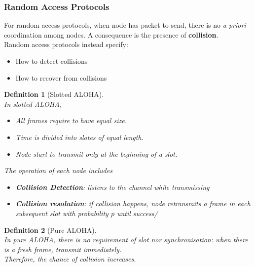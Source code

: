 \documentclass[12pt]{article}
\newtheorem{definition}{Definition}[section]
\theoremstyle{definition}
\begin{document}
\subsubsection{Random Access Protocols}
For random access protocols, when node has packet to send, there is no \textit{a priori} coordination among nodes. A consequence is the presence of \textbf{collision}.\\Random access protocols instead specify:
\begin{itemize}
  \item How to detect collisions
  \item How to recover from collisions
\end{itemize}
\begin{definition}[Slotted ALOHA]
\hfill\\\normalfont In slotted ALOHA,
\begin{itemize}
  \item All frames require to have equal size.
  \item Time is divided into slotes of equal length.
  \item Node start to transmit only at the beginning of a slot.
\end{itemize}
The operation of each node includes
\begin{itemize}
\item \textbf{Collision Detection}: listens to the channel while transmissing
\item \textbf{Collision resolution}: if collision happens, node retransmits a frame in \textit{each subsequent} slot with probability $p$ until success/
\end{itemize}
\end{definition}
\begin{definition}[Pure ALOHA]
\hfill\\\normalfont In pure ALOHA, there is no requirement of slot nor synchronisation: when there is a fresh frame, transmit immediately.\\Therefore, the chance of collision increases.
\end{definition}
\end{document}
